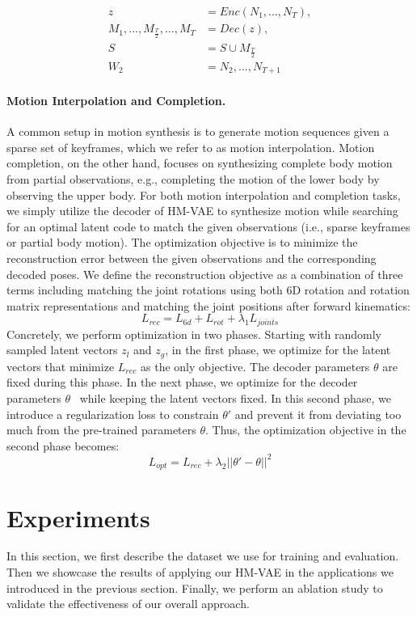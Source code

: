 \begin{align}
z &= Enc(N_1, ..., N_T), \\
M_1, ..., M_{\frac{T}{2}}, ..., M_T &= Dec(z), \\
S &= S \cup M_{\frac{T}{2}} \\
W_2 &= {N_2, ..., N_{T+1}}
\end{align}



\paragraph{Motion Interpolation and Completion.}
A common setup in motion synthesis is to generate motion sequences given a sparse set of keyframes, which we refer to as motion interpolation. Motion completion, on the other hand, focuses on synthesizing complete body motion from partial observations, e.g., completing the motion of the lower body by observing the upper body. For both motion interpolation and completion tasks, we simply utilize the decoder of HM-VAE to synthesize motion while searching for an optimal latent code to match the given observations (i.e., sparse keyframes or partial body motion). The optimization objective is to minimize the reconstruction error between the given observations and the corresponding decoded poses. We define the reconstruction objective as a combination of three terms including matching the joint rotations using both 6D rotation and rotation matrix representations and matching the joint positions after forward kinematics:
\begin{equation}
    L_{rec} = L_{6d} + L_{rot} + \lambda_1 L_{joints}
\end{equation}
Concretely, we perform optimization in two phases. Starting with randomly sampled latent vectors $z_l$ and $z_g$, in the first phase, we optimize for the latent vectors that minimize $L_{rec}$ as the only objective. The decoder parameters $\theta$ are fixed during this phase. In the next phase, we optimize for the decoder parameters $\theta$~\cite{yang2020deep} while keeping the latent vectors fixed. In this second phase, we introduce a regularization loss to constrain $\theta '$ and prevent it from deviating too much from the pre-trained parameters $\theta$. Thus, the optimization objective in the second phase becomes:  
\begin{equation}
    L_{opt} = L_{rec} + \lambda_2 ||\theta ' - \theta||^2
\end{equation}

\section{Experiments}
In this section, we first describe the dataset we use for training and evaluation. Then we showcase the results of applying our HM-VAE in the applications we introduced in the previous section. Finally, we perform an ablation study to validate the effectiveness of our overall approach. 

